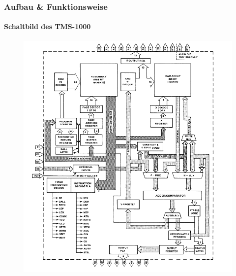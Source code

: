 \begin{frame}
	\frametitle{Aufbau \& Funktionsweise}
		\framesubtitle{Schaltbild des TMS-1000}
\begin{figure}
	\centering
		\includegraphics[scale=0.28]{images/schaltbild.PNG}
\end{figure}
\end{frame}

